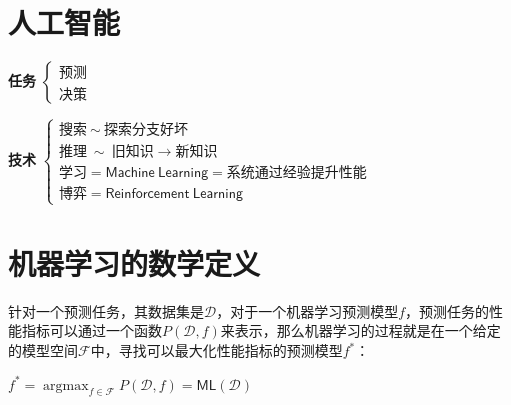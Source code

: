 \documentclass[12pt,a4paper]{article}
\begin{document}
\section*{\color{mainblue}\large 人工智能}

\begin{tcolorbox}[
    colback=white,
    colframe=mainblue,
    boxrule=0.5pt,
    arc=2mm,
    left=15pt,right=15pt,top=10pt,bottom=10pt
]
\textbf{任务}\quad
$\begin{cases}
    \text{预测}\\
    \text{决策}
\end{cases}$

\vspace{0.6em}

\textbf{技术}\quad
$\begin{cases}
    \text{搜索}\ \sim\ \text{探索分支好坏}\\
    \text{推理}\ \sim\ \text{旧知识}\rightarrow\text{新知识}\\
    \text{学习}=\mathsf{Machine\ Learning}=\text{系统通过经验提升性能}\\
    \text{博弈}=\mathsf{Reinforcement\ Learning}
\end{cases}$
\end{tcolorbox}

\section*{\color{mainblue}\large 机器学习的数学定义}

\begin{tcolorbox}[
    colback=lightgray,
    colframe=lightgray,
    boxrule=0pt,
    arc=3mm,
    left=12pt,right=12pt,top=12pt,bottom=12pt
]
针对一个预测任务，其数据集是$\mathcal{D}$，对于一个机器学习预测模型$f$，预测任务的性能指标可以通过一个函数$P(\mathcal{D},f)$来表示，那么机器学习的过程就是在一个给定的模型空间$\mathcal{F}$中，寻找可以最大化性能指标的预测模型$f^*$：

\vspace{1em}

\begin{center}
\large
$
\displaystyle f^* = \mathop{\arg\max}_{f \in \mathcal{F}} P(\mathcal{D},f) = \mathsf{ML}(\mathcal{D})
$
\end{center}
\end{tcolorbox}
\end{document}
